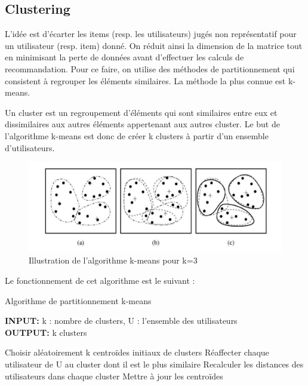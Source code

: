 \subsection{Clustering}
L’idée est d’écarter les items (resp. les utilisateurs) jugés non représentatif pour un utilisateur (resp. item) donné. On réduit ainsi la dimension de la matrice tout en minimisant la perte de données avant d’effectuer les calculs de recommandation.
Pour ce faire, on utilise des méthodes de partitionnement qui consistent à regrouper les éléments similaires. La méthode la plus connue est k-means.\par
Un cluster est un regroupement d'éléments qui sont similaires entre eux et dissimilaires aux autres éléments appertenant aux autres cluster. Le but de l'algorithme k-means est donc de créer k clusters à partir d'un ensemble d'utilisateurs.

\begin{figure}[H]
	\begin{center}
		\includegraphics[scale=0.27]{img/k_means.png}
	\end{center}
	\caption{Illustration de l'algorithme k-means pour k=3}
\end{figure}

Le fonctionnement de cet algorithme est le suivant :
\begin{algorithm}
\caption{Algorithme de partitionnement k-means}
\textbf{INPUT:} k : nombre de clusters, U : l'ensemble des utilisateurs\\
\textbf{OUTPUT:} k clusters
\begin{algorithmic}
\STATE Choisir aléatoirement k centroïdes initiaux de clusters
\REPEAT
\STATE Réaffecter chaque utilisateur de U au cluster dont il est le plus similaire
\STATE Recalculer les distances des utilisateurs dans chaque cluster
\STATE Mettre à jour les centroïdes
\end{algorithmic}
\end{algorithm}

